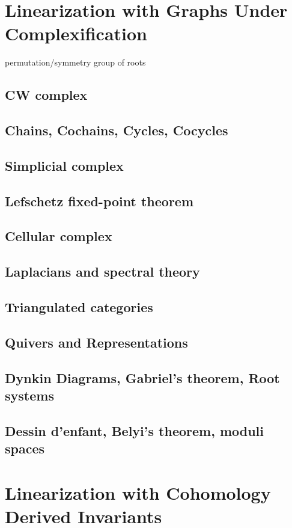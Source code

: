 \documentclass{article}
\theoremstyle{definition}
\begin{document}
\section{Linearization with Graphs Under Complexification}
        permutation/symmetry group of roots
    \subsection{CW complex}
    \subsection{Chains, Cochains, Cycles, Cocycles}
    \subsection{Simplicial complex}
    \subsection{Lefschetz fixed-point theorem}
    \subsection{Cellular complex}
    \subsection{Laplacians and spectral theory}
    \subsection{Triangulated categories} 
    \subsection{Quivers and Representations}
    \subsection{Dynkin Diagrams, Gabriel's theorem, Root systems}
    \subsection{Dessin d'enfant, Belyi's theorem, moduli spaces}


\section{Linearization with Cohomology Derived Invariants}
\end{document}
